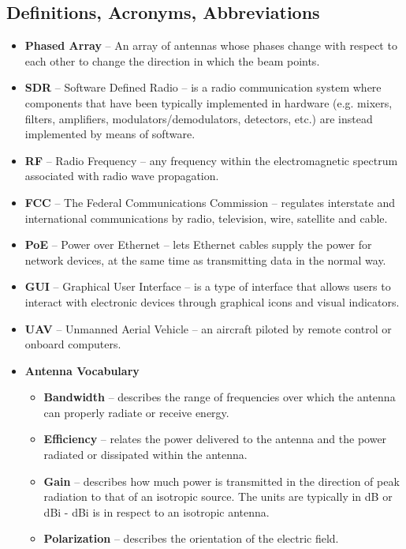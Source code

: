 \documentclass[ProductRequirements.tex]{subfiles}
\begin{document}
	\subsection{Definitions, Acronyms, Abbreviations}
		\begin{itemize}
			\item \textbf{Phased Array} -- An array of antennas whose phases change with respect to each other to change the direction in which the beam points.
			\item \textbf{SDR} -- Software Defined Radio -- is a radio communication system where components that have been typically implemented in hardware (e.g. mixers, filters, amplifiers, modulators/demodulators, detectors, etc.) are instead implemented by means of software. 
			\item \textbf{RF} -- Radio Frequency --  any frequency within the electromagnetic spectrum associated with radio wave propagation. 
			\item \textbf{FCC} -- The Federal Communications Commission -- regulates interstate and international communications by radio, television, wire, satellite and cable.
			\item \textbf{PoE} -- Power over Ethernet -- lets Ethernet cables supply the power for network devices, at the same time as transmitting data in the normal way. 
			\item \textbf{GUI} -- Graphical User Interface -- is a type of interface that allows users to interact with electronic devices through graphical icons and visual indicators.
			\item \textbf{UAV} -- Unmanned Aerial Vehicle -- an aircraft piloted by remote control or onboard computers.
			\item \textbf{Antenna Vocabulary}
			\begin{itemize}
				\item \textbf{Bandwidth} -- describes the range of frequencies over which the antenna can properly radiate or receive energy.
				\item \textbf{Efficiency} -- relates the power delivered to the antenna and the power radiated or dissipated within the antenna.
				\item \textbf{Gain} -- describes how much power is transmitted in the direction of peak radiation to that of an isotropic source. The units are typically in dB or dBi - dBi is in respect to an isotropic antenna. 
				\item \textbf{Polarization} -- describes the orientation of the electric field.
			\end{itemize}
		\end{itemize}
\end{document}
